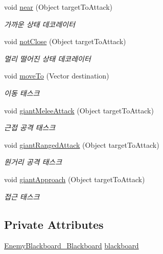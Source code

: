 \begin{DoxyCompactItemize}
void \hyperlink{class_giant_behavior_tree___behavior_tree_a3261ee943f9e8045c66bde4489592b42}{near} (Object target\+To\+Attack)
\begin{DoxyCompactList}\small\item\em 가까운 상태 데코레이터 \end{DoxyCompactList}\item 
void \hyperlink{class_giant_behavior_tree___behavior_tree_a6659209498adb2b5f5b9567bd09262f3}{not\+Close} (Object target\+To\+Attack)
\begin{DoxyCompactList}\small\item\em 멀리 떨어진 상태 데코레이터 \end{DoxyCompactList}\item 
void \hyperlink{class_giant_behavior_tree___behavior_tree_a760f8efcdfb234c0063f67b5f785d553}{move\+To} (Vector destination)
\begin{DoxyCompactList}\small\item\em 이동 태스크 \end{DoxyCompactList}\item 
void \hyperlink{class_giant_behavior_tree___behavior_tree_a314e61e0592a048e3158cf8f93cb97c5}{giant\+Melee\+Attack} (Object target\+To\+Attack)
\begin{DoxyCompactList}\small\item\em 근접 공격 태스크 \end{DoxyCompactList}\item 
void \hyperlink{class_giant_behavior_tree___behavior_tree_ac75fb490e2e79c01d24eb4f9a7c6e388}{giant\+Ranged\+Attack} (Object target\+To\+Attack)
\begin{DoxyCompactList}\small\item\em 원거리 공격 태스크 \end{DoxyCompactList}\item 
void \hyperlink{class_giant_behavior_tree___behavior_tree_a0731104134b84cbba860cd168fc3993a}{giant\+Approach} (Object target\+To\+Attack)
\begin{DoxyCompactList}\small\item\em 접근 태스크 \end{DoxyCompactList}\end{DoxyCompactItemize}
\subsection*{Private Attributes}
\begin{DoxyCompactItemize}
\item 
\hyperlink{class_enemy_blackboard___blackboard}{Enemy\+Blackboard\+\_\+\+Blackboard} \hyperlink{class_giant_behavior_tree___behavior_tree_a2e26ad9e0c272be24d87a8c1a283895a}{blackboard}
\end{DoxyCompactItemize}


